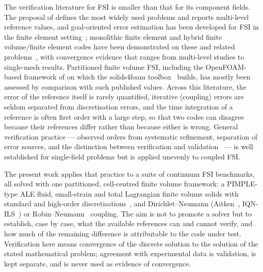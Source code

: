 The verification literature for FSI is smaller than that for its component fields.
The proposal of \citet{Turek2006} defines the most widely used problems and reports multi-level reference values, and goal-oriented error estimation has been developed for FSI in the finite element setting~\citep{Richter2012, Richter2017}; monolithic finite element and hybrid finite volume/finite element codes have been demonstrated on these and related problems~\citep{Heil2004, Heil2008, Eken2016, Lozovskiy2019}, with convergence evidence that ranges from multi-level studies to single-mesh results.
Partitioned finite volume FSI, including the OpenFOAM-based framework of \citet{Tukovic2018} on which the solids4foam toolbox~\citep{Cardiff2025} builds, has mostly been assessed by comparison with such published values.
Across this literature, the error of the reference itself is rarely quantified, iterative (coupling) errors are seldom separated from discretisation errors, and the time integration of a reference is often first order with a large step, so that two codes can disagree because their references differ rather than because either is wrong.
General verification practice --- observed orders from systematic refinement, separation of error sources, and the distinction between verification and validation~\citep{Roache1998, Oberkampf2010} --- is well established for single-field problems but is applied unevenly to coupled FSI.

The present work applies that practice to a suite of continuum FSI benchmarks, all solved with one partitioned, cell-centred finite volume framework: a PIMPLE-type ALE fluid, small-strain and total Lagrangian finite volume solids with standard and high-order discretisations~\citep{Cardiff2026, Batistic2026}, and Dirichlet--Neumann (Aitken~\citep{kuttler2008fixed}, IQN-ILS~\citep{Degroote2009}) or Robin--Neumann~\citep{Tukovic2018b} coupling.
The aim is not to promote a solver but to establish, case by case, what the available references can and cannot verify, and how much of the remaining difference is attributable to the code under test.
Verification here means convergence of the discrete solution to the solution of the stated mathematical problem; agreement with experimental data is validation, is kept separate, and is never used as evidence of convergence.


